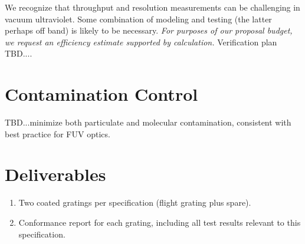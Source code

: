 \documentclass[12pt]{article}
\begin{document}
We recognize that throughput and resolution measurements can be challenging in vacuum ultraviolet. Some combination of modeling and testing (the latter perhaps off band) is likely to be necessary. \emph{For purposes of our proposal budget, we request an efficiency estimate supported by calculation.} Verification plan TBD....


\section{Contamination Control}

TBD...minimize both particulate and molecular contamination, consistent with best practice for FUV optics.


\section{Deliverables} \label{sec:deliverables}
\begin{enumerate}
   \item Two coated gratings per specification (flight grating plus spare).
   \item Conformance report for each grating, including all test results relevant to this specification.
\end{enumerate}
\end{document}
